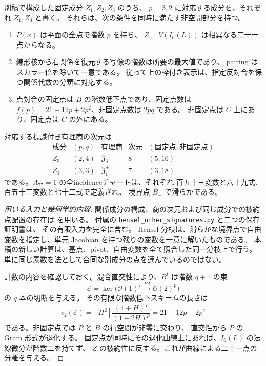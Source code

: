 \begin{proposition}[既存成分と開条件]
\label{prop:prym-baseline-v26}
別稿\cite{PaperII}で構成した固定成分 $Z_1,Z_2,Z_3$ のうち、
$p=3,2$ に対応する成分を、それぞれ $Z_1,Z_3$ と書く。
それらは、次の条件を同時に満たす非空開部分を持つ。
\begin{enumerate}
\item $P(x)$ は平面の全点で階数 $p$ を持ち、
$Z=V(I_6(L))$ は相異なる二十一点からなる。
\item 線形核から右関係を復元する写像の階数は所要の最大値であり、
pairing はスカラー倍を除いて一意である。
従って上の枠付き表示は、指定反対合を保つ関係代数の分類に対応する。
\item 点対合の固定点は $B$ の階数低下点であり、固定点数は
$f(p)=21-12p+2p^2$、非固定点数は $2pq$ である。
非固定点は $C$ 上にあり、固定点は $C$ の外にある。
\end{enumerate}
対応する標識付き有理商の次元は
\[
 \begin{array}{c|c|c|c|c}
 \text{成分}&(p,q)&\text{有理商}&\text{次元}&(\text{固定点},\text{非固定点})\\\hline
 Z_3&(2,4)&\mathfrak Z_3&8&(5,16)\\
 Z_1&(3,3)&\mathfrak Z_1^+&7&(3,18)
 \end{array}
\]
である。$A_{77}=1$ の全incidenceチャートは、それぞれ
百五十三変数と六十九式、百五十三変数と七十二式で定義され、
境界点 $B_-$ で滑らかである。
\end{proposition}

\begin{proof}[用いる入力と幾何学的内容]
関係成分の構成、商の次元および同じ成分での被約点配置の存在は
\cite[反対合の固定部分族・全署名の点配置の各節]{PaperII}を用いる。
付属の \nolinkurl{hensel_other_signatures.py} と二つの保存証明書は、
その有限入力を完全に含む。
Hensel 分枝は、滑らかな境界点で自由変数を指定し、単元 Jacobian を持つ残りの変数を一意に解いたものである。
本稿の新しい計算は、基点、pivot、自由変数を全て照合した同一分枝上で行う。
単に同じ素数を法として合同な別成分の点を選んでいるのではない。

計数の内容を確認しておく。混合直交性により、$B^t$ は階数 $q+1$ の束
\[
 \mathcal E=\ker\bigl(\mathcal O(1)^7\xrightarrow{PA}\mathcal O(2)^p\bigr)
\]
の $q$ 本の切断を与える。
その有限な階数低下スキームの長さは
\[
 c_2(\mathcal E)=[H^2]\frac{(1+H)^7}{(1+2H)^p}=21-12p+2p^2
\]
である。非固定点では $P$ と $B$ の行空間が非零に交わり、
直交性から $P$ の Gram 形式が退化する。
固定点が同時にその退化曲線上にあれば、$I_6(L)$ の法線微分が階数二を持てず、
$Z$ の被約性に反する。これが曲線による二十一点の分離を与える。
\end{proof}

